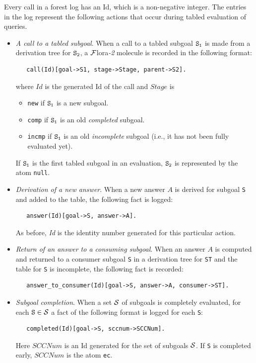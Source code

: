 \documentclass[11pt]{article}
\newcommand{\FLORA}{{\mbox{\sc ${\cal F}${lora}\rm\emph{-2}}}\xspace}
\begin{document}
Every call in a forest log has an Id, which is a non-negative integer.
The entries in the log represent the following actions that occur during
tabled evaluation of queries.
\begin{itemize}
\item \emph{A call to a tabled subgoal}. When a call to a tabled subgoal $\tt S_1$ is
  made from a derivation tree for $\tt S_2$, a \FLORA molecule is recorded in
  the following format:
\begin{verbatim}
   call(Id)[goal->S1, stage->Stage, parent->S2].
\end{verbatim}
  where $Id$ is the generated Id of the call and $Stage$ is
  \begin{itemize}
  \item {\tt new} if $\tt S_1$ is a new subgoal.
  \item {\tt comp} if $\tt S_1$ is an old \emph{completed} subgoal.
  \item {\tt incmp} if $\tt S_1$ is an old \emph{incomplete} subgoal (i.e., it
    has not been fully evaluated yet).
  \end{itemize}
  If $\tt S_1$ is the first tabled subgoal in an evaluation, $\tt S_2$ is
  represented by the atom {\tt null}.
  
\item \emph{Derivation of a new answer}. When a new answer $A$ is derived for 
  subgoal \texttt{S}  and added to the table, the following fact is logged:
\begin{verbatim}
   answer(Id)[goal->S, answer->A].
\end{verbatim}
  As before, \emph{Id} is the identity number generated for this particular
  action. 

\item \emph{Return of an answer to a consuming subgoal}. When an answer $A$ is
  computed and
  returned to a consumer subgoal \texttt{S} in a derivation tree for
  \texttt{ST}  and the
  table for \texttt{S}
  is incomplete, the following fact is recorded:
\begin{verbatim}  
   answer_to_consumer(Id)[goal->S, answer->A, consumer->ST].
\end{verbatim}  

\item \emph{Subgoal completion}. When a set ${\cal S}$ of subgoals is 
  completely evaluated, for each $\texttt{S} \in {\cal S}$ a fact of the following
  format is logged for each \texttt{S}: 
\begin{verbatim}  
   completed(Id)[goal->S, sccnum->SCCNum].
\end{verbatim}  
  Here $SCCNum$ is an Id generated for the set of subgoals ${\cal S}$.
  If \texttt{S}  is completed early, $SCCNum$ is the atom {\tt ec}. 
  

\end{itemize}
\end{document}
